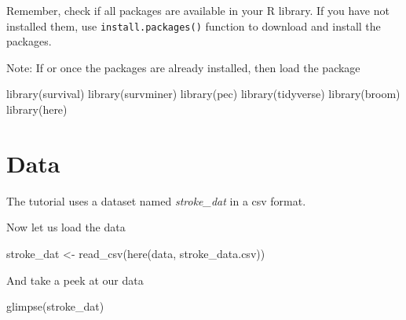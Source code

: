 \documentclass[
]{book}
\makeatletter
\newenvironment{Shaded}{\begin{snugshade}}{\end{snugshade}}
\newcommand{\FunctionTok}[1]{\textcolor[rgb]{0,0,0}{#1}}
\newcommand{\NormalTok}[1]{#1}
\newcommand{\OtherTok}[1]{\textcolor[rgb]{0.37,0.37,0.37}{#1}}
\newcommand{\StringTok}[1]{\textcolor[rgb]{0.5,0.5,0.5}{#1}}
\newenvironment{kframe}{%
\medskip{}
\setlength{\fboxsep}{.8em}
 \def\at@end@of@kframe{}%
 \ifinner\ifhmode%
  \def\at@end@of@kframe{\end{minipage}}%
  \begin{minipage}{\columnwidth}%
 \fi\fi%
 \def\FrameCommand##1{\hskip\@totalleftmargin \hskip-\fboxsep
 \colorbox{shadecolor}{##1}\hskip-\fboxsep
     \hskip-\linewidth \hskip-\@totalleftmargin \hskip\columnwidth}%
 \MakeFramed {\advance\hsize-\width
   \@totalleftmargin\z@ \linewidth\hsize
   \@setminipage}}%
 {\par\unskip\endMakeFramed%
 \at@end@of@kframe}
\renewenvironment{Shaded}{\begin{kframe}}{\end{kframe}}
\makeatother
\begin{document}
Remember, check if all packages are available in your R library. If you have not installed them, use \texttt{install.packages()} function to download and install the packages.

Note: If or once the packages are already installed, then load the package

\begin{Shaded}
\begin{Highlighting}[]
\FunctionTok{library}\NormalTok{(survival)}
\FunctionTok{library}\NormalTok{(survminer)}
\FunctionTok{library}\NormalTok{(pec)}
\FunctionTok{library}\NormalTok{(tidyverse)}
\FunctionTok{library}\NormalTok{(broom)}
\FunctionTok{library}\NormalTok{(here)}
\end{Highlighting}
\end{Shaded}

\hypertarget{data-1}{%
\section{Data}\label{data-1}}

The tutorial uses a dataset named \emph{stroke\_dat} in a csv format.

Now let us load the data

\begin{Shaded}
\begin{Highlighting}[]
\NormalTok{stroke\_dat }\OtherTok{\textless{}{-}} \FunctionTok{read\_csv}\NormalTok{(}\FunctionTok{here}\NormalTok{(}\StringTok{\textquotesingle{}data\textquotesingle{}}\NormalTok{, }\StringTok{\textquotesingle{}stroke\_data.csv\textquotesingle{}}\NormalTok{))}
\end{Highlighting}
\end{Shaded}

And take a peek at our data

\begin{Shaded}
\begin{Highlighting}[]
\FunctionTok{glimpse}\NormalTok{(stroke\_dat)}
\end{Highlighting}
\end{Shaded}
\end{document}
